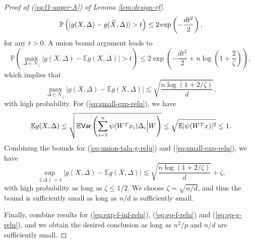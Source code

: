 \begin{proof}[Proof of (\ref{eq:l1-upper-A}) of Lemma \ref{lem:design-rf}]
$$\mathbb{P}\left(|g(X,\Delta)-g(\wt{X},\Delta)|>t\right) \leq 2\exp\left(-\frac{dt^2}{2}\right),$$
for any $t>0$. A union bound argument leads to
$$\mathbb{P}\left(\max_{\Delta\in\mathcal{N}_{\zeta}}|g(X,\Delta) - \mathbb{E}g(X,\Delta)|>t\right)\leq 2\exp\left(-\frac{dt^2}{2}+n\log\left(1+\frac{2}{\zeta}\right)\right),$$
which implies that
$$\max_{\Delta\in\mathcal{N}_{\zeta}}|g(X,\Delta) - \mathbb{E}g(X,\Delta)|\lesssim \sqrt{\frac{n\log(1+2/\zeta)}{d}},$$
with high probability. For (\ref{eq:small-exp-relu}), we have
$$\mathbb{E}g(X,\Delta)\leq \sqrt{\mathbb{E}\textsf{Var}\left(\sum_{i=1}^n\psi(W^Tx_i)\Delta_i\Big|W\right)}\leq \sqrt{\mathbb{E}|\psi(W^Tx)|^2}\leq 1.$$
Combining the bounds for (\ref{eq:union-tala-g-relu}) and (\ref{eq:small-exp-relu}), we have
$$\sup_{\|\Delta\|=1}|g(X,\Delta) - \mathbb{E}g(X,\Delta)|\lesssim \sqrt{\frac{n\log(1+2/\zeta)}{d}} + \zeta,$$
with high probability as long as $\zeta\leq 1/2$. We choose $\zeta=\sqrt{n/d}$, and thus the bound is sufficiently small as long as $n/d$ is sufficiently small.

Finally, combine results for (\ref{eq:exp-f-inf-relu}), (\ref{eq:ep-f-relu}) and (\ref{eq:ep-g-relu}), and we obtain the desired conclusion as long as $n^2/p$ and $n/d$ are sufficiently small.
\end{proof}

